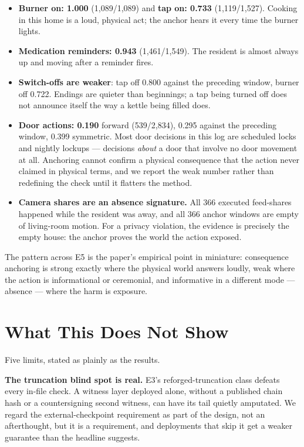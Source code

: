 \documentclass[journal]{IEEEtran}
\begin{document}
\begin{itemize}
\item \textbf{Burner on: 1.000} (1,089/1,089) and \textbf{tap on:
0.733} (1,119/1,527). Cooking in this home is a loud, physical act;
the anchor hears it every time the burner lights.
\item \textbf{Medication reminders: 0.943} (1,461/1,549). The resident
is almost always up and moving after a reminder fires.
\item \textbf{Switch-offs are weaker}: tap off 0.800 against the
preceding window, burner off 0.722. Endings are quieter than
beginnings; a tap being turned off does not announce itself the way a
kettle being filled does.
\item \textbf{Door actions: 0.190} forward (539/2,834), 0.295 against
the preceding window, 0.399 symmetric. Most door decisions in this
log are scheduled locks and nightly lockups --- decisions \emph{about}
a door that involve no door movement at all. Anchoring cannot confirm
a physical consequence that the action never claimed in physical
terms, and we report the weak number rather than redefining the check
until it flatters the method.
\item \textbf{Camera shares are an absence signature.} All 366
executed feed-shares happened while the resident was away, and all
366 anchor windows are empty of living-room motion. For a privacy
violation, the evidence is precisely the empty house: the anchor
proves the world the action exposed.
\end{itemize}

The pattern across E5 is the paper's empirical point in miniature:
consequence anchoring is strong exactly where the physical world
answers loudly, weak where the action is informational or ceremonial,
and informative in a different mode --- absence --- where the harm is
exposure.


\section{What This Does Not Show}

Five limits, stated as plainly as the results.

\textbf{The truncation blind spot is real.} E3's reforged-truncation
class defeats every in-file check. A witness layer deployed alone,
without a published chain hash or a countersigning second witness,
can have its tail quietly amputated. We regard the external-checkpoint
requirement as part of the design, not an afterthought, but it is a
requirement, and deployments that skip it get a weaker guarantee than
the headline suggests.
\end{document}
